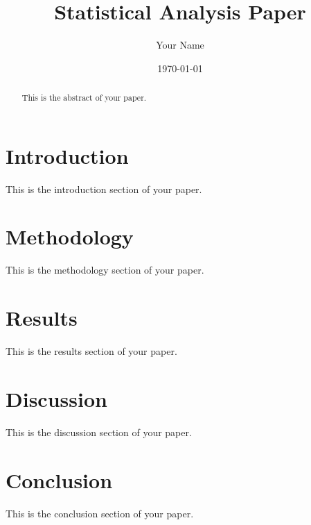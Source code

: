 \documentclass{article}
\title{Statistical Analysis Paper}
\author{Your Name}
\date{\today}
\begin{document}
\maketitle

\begin{abstract}
This is the abstract of your paper.
\end{abstract}

\section{Introduction}
This is the introduction section of your paper.

\section{Methodology}
This is the methodology section of your paper.

\section{Results}
This is the results section of your paper.

\section{Discussion}
This is the discussion section of your paper.

\section{Conclusion}
This is the conclusion section of your paper.



\end{document}
